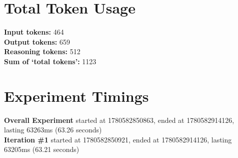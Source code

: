 \documentclass{article}
\begin{document}
\section*{Total Token Usage}
\textbf{Input tokens: }464
\\\textbf{Output tokens: }659
\\\textbf{Reasoning tokens: }512
\\\textbf{Sum of `total tokens': }1123
\section*{Experiment Timings}
\textbf{Overall Experiment} started at 1780582850863, ended at 1780582914126, lasting 63263ms (63.26 seconds)
\\\textbf{Iteration \#1} started at 1780582850921, ended at 1780582914126, lasting 63205ms (63.21 seconds)
\end{document}
